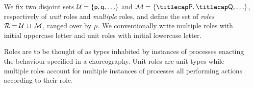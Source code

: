 %

We fix two disjoint sets $\participants = \{\ptp p, \ptp q, \ldots\}$
and $\multiroles = \{\amulti P, \amulti Q, \ldots \}$, respectively of
\emph{unit} roles and \emph{multiple} roles, and define the set of
\emph{roles} $\mathcal{R} = \mathcal{U}\, \cup\, \mathcal{M}$, ranged over by $\rho$.
%
We conventionally write multiple roles with initial uppercase letter and
unit roles with initial lowercase letter.
%

Roles are to be thought of as types inhabited by instances of
processes enacting the behaviour specified in a choreography.
%
Unit roles are unit types while multiple roles account for multiple
instances of processes all performing actions according to their role.
%

